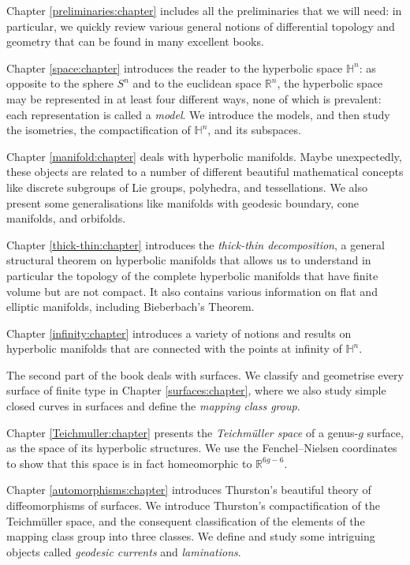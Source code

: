 \documentclass [11pt]{amsbook}
\theoremstyle{definition}
\theoremstyle{remark}
\numberwithin{section}{chapter}  %
\numberwithin{subsection}{section}  %
\numberwithin{figure}{chapter}
\numberwithin{table}{chapter}
\newcommand{\matR} {\ensuremath {\mathbb{R}}}
\newcommand{\matH} {\ensuremath {\mathbb{H}}}
\begin{document}
Chapter \ref{preliminaries:chapter} includes all the preliminaries that we will need: in particular, we quickly review various general notions of differential topology and geometry that can be found in many excellent books.  

Chapter \ref{space:chapter} introduces the reader to the hyperbolic space $\matH^n$: as opposite to the sphere $S^n$ and to the euclidean space $\matR^n$, the hyperbolic space may be represented in at least four different ways, none of which is prevalent: each representation is called a \emph{model}. We introduce the models, and then study the isometries, the compactification of $\matH^n$, and its subspaces. 

Chapter \ref{manifold:chapter} deals with hyperbolic manifolds. Maybe unexpectedly, these objects are related to a number of different beautiful mathematical concepts like discrete subgroups of Lie groups, polyhedra, and tessellations. We also present some generalisations like manifolds with geodesic boundary, cone manifolds, and orbifolds.

Chapter \ref{thick-thin:chapter} introduces the \emph{thick-thin decomposition}, a general structural theorem on hyperbolic manifolds that allows us to understand in particular the topology of the complete hyperbolic manifolds that have finite volume but are not compact. It also contains various information on flat and elliptic manifolds, including Bieberbach's Theorem.

Chapter \ref{infinity:chapter} introduces a variety of notions and results on hyperbolic manifolds that are connected with the points at infinity of $\matH^n$. 

The second part of the book deals with surfaces. We classify and geometrise every surface of finite type in Chapter \ref{surfaces:chapter}, where we also study simple closed curves in surfaces and define the \emph{mapping class group}.

Chapter \ref{Teichmuller:chapter} presents the \emph{Teichm\"uller space} of a genus-$g$ surface, as the space of its hyperbolic structures. We use the Fenchel--Nielsen coordinates to show that this space is in fact homeomorphic to $\matR^{6g-6}$.

Chapter \ref{automorphisms:chapter} introduces Thurston's beautiful theory of diffeomorphisms of surfaces. We introduce Thurston's compactification of the Teichm\"uller space, and the consequent classification of the elements of the mapping class group into three classes. We define and study some intriguing objects called \emph{geodesic currents} and \emph{laminations}.
\end{document}
